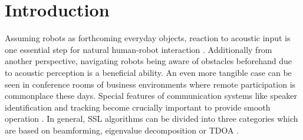 \chapter{Introduction}
\label{chap:01_introduction}



Assuming robots as forthcoming everyday objects, reaction to acoustic
input is one essential step for natural human-robot interaction \cite{audio_loca_robotics,socially_interactive_robots}.
Additionally from another perspective, navigating robots being aware of obstacles beforehand
due to acoustic perception is a beneficial ability.
An even more tangible case can be seen in conference rooms of business environments
where remote participation is commonplace these days.
Special features of communication systems like speaker identification and tracking
become crucially important to provide smooth operation \cite{Brandstein96apractical}.
In general, \ac{SSL} algorithms can be divided into three categories
which are based on beamforming, eigenvalue
decomposition or \ac{TDOA} \cite{Brandstein96apractical,gcc_time_broeck,benesty_passive_acoustic}.

